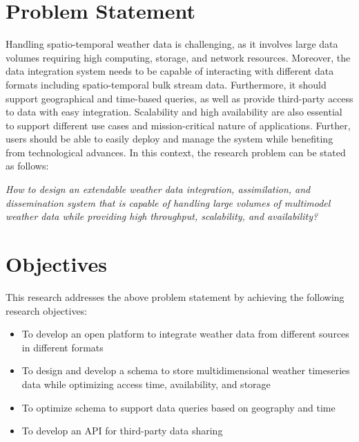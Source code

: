\section{Problem Statement}
Handling spatio-temporal weather data is challenging, as it involves large data volumes requiring high computing, storage, and network resources. Moreover, the data integration system needs to be capable of interacting with different data formats including spatio-temporal bulk stream data. Furthermore, it should support geographical and time-based queries, as well as provide third-party access to data with easy integration. Scalability and high availability are also essential to support different use cases and mission-critical nature of applications.
Further, users should be able to easily deploy and manage the system while benefiting from technological advances. %
In this context, the research problem can be stated as follows:

\emph{How to design an extendable weather data integration, assimilation, and dissemination system that is capable of handling large volumes of multimodel weather data while providing high throughput, scalability, and availability?}

\section{Objectives}
This research addresses the above problem statement by achieving the following research objectives:
\begin{itemize}
    \item To develop an open platform to integrate weather data from different sources in different formats
    \item To design and develop a schema to store multidimensional weather timeseries data while optimizing access time, availability, and storage
    \item To optimize schema to support data queries based on geography and time
    \item To develop an API for third-party data sharing
\end{itemize}

